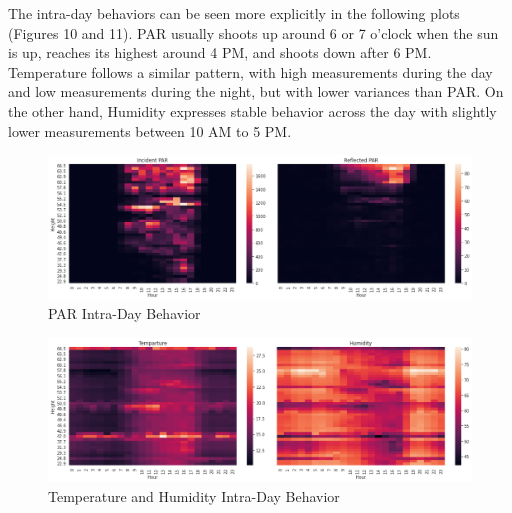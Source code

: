 \documentclass[11pt, letterpaper]{article}
\begin{document}
The intra-day behaviors can be seen more explicitly in the following plots (Figures 10 and 11). PAR usually shoots up around 6 or 7 o'clock when the sun is up, reaches its highest around 4 PM, and shoots down after 6 PM. Temperature follows a similar pattern, with high measurements during the day and low measurements during the night, but with lower variances than PAR. On the other hand, Humidity expresses stable behavior across the day with slightly lower measurements between 10 AM to 5 PM.
\begin{figure}[h!]
\centering
\includegraphics[width=1\textwidth]{eda_3.2.png}
\captionsetup{justification=centering}
\caption{PAR Intra-Day Behavior}
\end{figure}
\begin{figure}[h!]
\centering
\includegraphics[width=1\textwidth]{eda_3.3.png}
\captionsetup{justification=centering}
\caption{Temperature and Humidity Intra-Day Behavior}
\end{figure}



\paragraph{}
\end{document}
